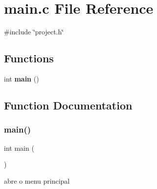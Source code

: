 \section{main.\+c File Reference}
\label{main_8c}
{\ttfamily \#include \char`\"{}project.\+h\char`\"{}}\newline
\subsection*{Functions}
\begin{DoxyCompactItemize}
\item 
int \textbf{ main} ()
\end{DoxyCompactItemize}


\subsection{Function Documentation}
\mbox{\label{main_8c_ae66f6b31b5ad750f1fe042a706a4e3d4}} 
\subsubsection{main()}
{\footnotesize\ttfamily int main (\begin{DoxyParamCaption}{ }\end{DoxyParamCaption})}

abre o menu principal 